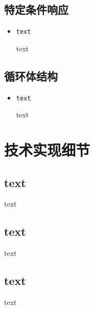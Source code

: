 \subsection{特定条件响应}
\begin{itemize}
    \item \begin{verbatim}text\end{verbatim}text
\end{itemize}


\subsection{循环体结构}
\begin{itemize}
    \item \begin{verbatim}text\end{verbatim}text
\end{itemize}

\section{技术实现细节}
\subsection{text}
text
\subsection{text}
text
\subsection{text}
text